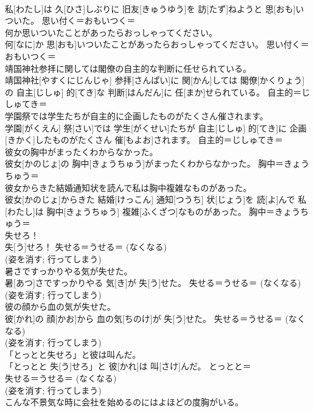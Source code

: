 \documentclass[8pt]{extreport}
\begin{document}
\begin{CJK}{UTF8}{min}
{\\	私[わたし]は 久[ひさ]しぶりに 旧友[きゅうゆう]を 訪[たず]ねようと 思[おも]いついた。	思い付く＝おもいつく＝ 
\\	何か思いついたことがあったらおっしゃってください。	
\\	何[なに]か 思[おも]いついたことがあったらおっしゃってください。	思い付く＝おもいつく＝ 
\\	靖国神社参拝に関しては閣僚の自主的な判断に任せられている。	
\\	靖国神社[やすくにじんじゃ] 参拝[さんぱい]に 関[かん]しては 閣僚[かくりょう]の 自主[じしゅ] 的[てき]な 判断[はんだん]に 任[まか]せられている。	自主的＝じしゅてき＝ 
\\	学園祭では学生たちが自主的に企画したものがたくさん催されます。	
\\	学園[がくえん] 祭[さい]では 学生[がくせい]たちが 自主[じしゅ] 的[てき]に 企画[きかく]したものがたくさん 催[もよお]されます。	自主的＝じしゅてき＝ 
\\	彼女の胸中がまったくわからなかった。	
\\	彼女[かのじょ]の 胸中[きょうちゅう]がまったくわからなかった。	胸中＝きょうちゅう＝ 
\\	彼女からきた結婚通知状を読んで私は胸中複雑なものがあった。	
\\	彼女[かのじょ]からきた 結婚[けっこん] 通知[つうち] 状[じょう]を 読[よ]んで 私[わたし]は 胸中[きょうちゅう] 複雑[ふくざつ]なものがあった。	胸中＝きょうちゅう＝ 
\\	失せろ！	
\\	失[う]せろ！	失せる＝うせる＝ (なくなる) 
\\	(姿を消す; 行ってしまう) 
\\	暑さですっかりやる気が失せた。	
\\	暑[あつ]さですっかりやる 気[き]が 失[う]せた。	失せる＝うせる＝ (なくなる) 
\\	(姿を消す; 行ってしまう) 
\\	彼の顔から血の気が失せた。	
\\	彼[かれ]の 顔[かお]から 血の気[ちのけ]が 失[う]せた。	失せる＝うせる＝ (なくなる) 
\\	(姿を消す; 行ってしまう) 
\\	「とっとと失せろ」と彼は叫んだ。	
\\	「とっとと 失[う]せろ」と 彼[かれ]は 叫[さけ]んだ。	とっとと＝ 
\\	失せる＝うせる＝ (なくなる) 
\\	(姿を消す; 行ってしまう) 
\\	こんな不景気な時に会社を始めるのにはよほどの度胸がいる。	
}
\end{CJK}
\end{document}
